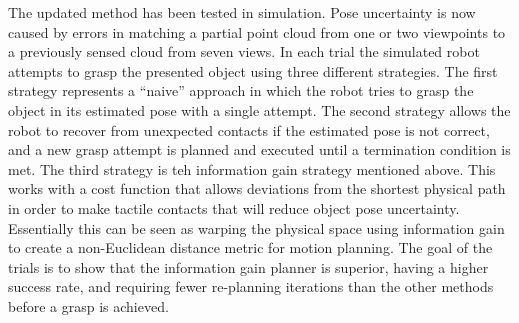 The updated method has been tested in simulation. Pose uncertainty is now caused by errors in matching a partial point cloud from one or two viewpoints to a previously sensed cloud from seven views. In each trial the simulated robot attempts to grasp the presented object using three different strategies. The first strategy represents a ``naive'' approach in which the robot tries to grasp the object in its estimated pose with a single attempt. The second strategy allows the robot to recover from unexpected contacts if the estimated pose is not correct, and a new grasp attempt is planned and executed until a termination condition is met. The third strategy is teh information gain strategy mentioned above. This works with a cost function that allows deviations from the shortest physical path in order to make tactile contacts that will reduce object pose uncertainty. Essentially this can be seen as warping the physical space using information gain to create a non-Euclidean distance metric
 for motion planning. The goal of the trials is to show that the information gain planner is superior, having a higher success rate, and requiring fewer re-planning iterations than the other methods before a grasp is achieved.
